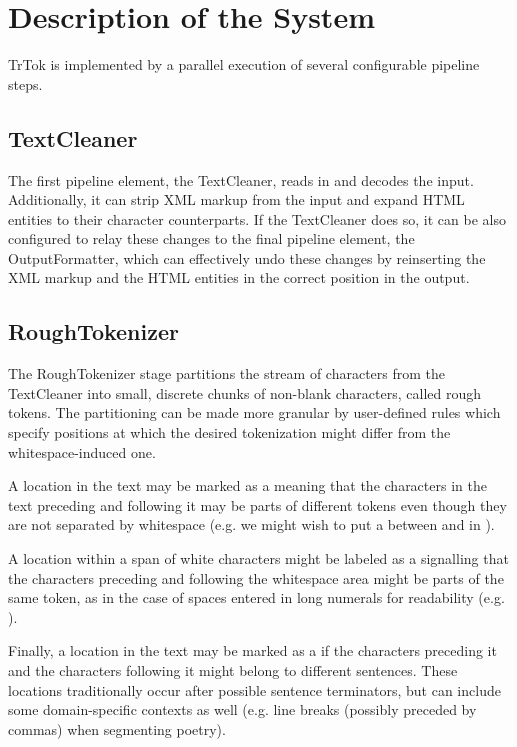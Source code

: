 \section{Description of the System}
\label{sec:system}

TrTok is implemented by a parallel execution of several configurable
pipeline steps.

\subsection{TextCleaner}

The first pipeline element, the TextCleaner, reads in and decodes the
input. Additionally, it can strip XML markup from the input and expand
HTML entities to their character counterparts. If the TextCleaner does
so, it can be also configured to relay these changes to the final
pipeline element, the OutputFormatter, which can effectively undo
these changes by reinserting the XML markup and the HTML entities in
the correct position in the output.

\subsection{RoughTokenizer}

The RoughTokenizer stage partitions the stream of characters from the
TextCleaner into small, discrete chunks of non-blank characters,
called rough tokens. The partitioning can be made more granular by
user-defined rules which specify positions at which the desired
tokenization might differ from the whitespace-induced one.

A location in the text may be marked as a \maysplit{} meaning that the
characters in the text preceding and following it may be parts of
different tokens even though they are not separated by whitespace
(e.g. we might wish to put a \maysplit{} between  and
 in ).

A location within a span of white characters might be labeled as a
\mayjoin{} signalling that the characters preceding and following the
whitespace area might be parts of the same token, as in the case of
spaces entered in long numerals for readability (e.g.
).

Finally, a location in the text may be marked as a \maybreaksentence{}
if the characters preceding it and the characters following it might
belong to different sentences. These locations traditionally occur
after possible sentence terminators, but can include some
domain-specific contexts as well (e.g. line breaks (possibly preceded
by commas) when segmenting poetry).

